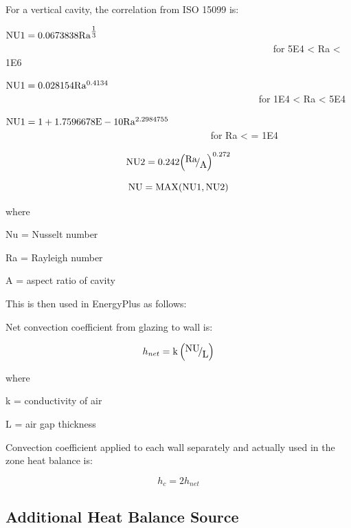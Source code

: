 For a vertical cavity, the correlation from ISO 15099 is:

\({\rm{NU1 = 0}}{\rm{.0673838 R}}{{\rm{a}}^{{\textstyle{\frac{{\rm{1}}}{{\rm{3}}}}}}}\) ~~~~~~~~~~~~~~~~~~~~~~~~~~~~~~~~~~~~~~~~~~~~~~~~~~~~~~~ for 5E4 \textless{} Ra \textless{} 1E6

\({\rm{NU1 = 0}}{\rm{.028154 R}}{{\rm{a}}^{{\rm{0}}{\rm{.4134}}}}\) ~~~~~~~~~~~~~~~~~~~~~~~~~~~~~~~~~~~~~~~~~~~~~~~~~~~~ for 1E4 \textless{} Ra \textless{} 5E4

\({\rm{NU1 = 1 + 1}}{\rm{.7596678E - 10 R}}{{\rm{a}}^{{\rm{2}}{\rm{.2984755}}}}\) ~~~~~~~~~~~~~~~~~~~~~~~~~~~~~~~~~~~~~~~~~~ for Ra \textless{} = 1E4

\begin{equation}
{\rm{NU2}} = 0.242{\left( {{\raise0.7ex\hbox{{{\rm{Ra}}}} \!\mathord{\left/ {\vphantom {{{\rm{Ra}}} {\rm{A}}}}\right.}\!\lower0.7ex\hbox{{\rm{A}}}}} \right)^{0.272}}
\end{equation}

\begin{equation}
{\rm{NU = MAX(NU1,NU2)}}
\end{equation}

where

Nu = Nusselt number

Ra = Rayleigh number

A = aspect ratio of cavity

This is then used in EnergyPlus as follows:

Net convection coefficient from glazing to wall is:

\begin{equation}
{h_{net}} = {\rm{k}}\left( {{\raise0.7ex\hbox{{{\rm{NU}}}} \!\mathord{\left/ {\vphantom {{{\rm{NU}}} {\rm{L}}}}\right.}\!\lower0.7ex\hbox{{\rm{L}}}}} \right)
\end{equation}

where

k = conductivity of air

L = air gap thickness

Convection coefficient applied to each wall separately and actually used in the zone heat balance is:

\begin{equation}
{h_c} = 2{h_{net}}
\end{equation}

\subsection{Additional Heat Balance Source}\label{additional-heat-balance-source}


